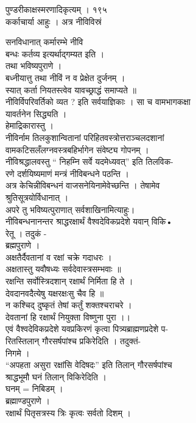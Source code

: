 \documentclass[11pt, openany]{book}
\begin{document}
{{{{ }{पुण्डरीकाक्षस्मरणादिकृत्यम् । १९५}{\\
कर्काचार्या आहुः । अत्र नीविवि}{स्रं}{सनविधानात् कर्मारम्भे नीवि\\
बन्धः कर्तव्य इत्यर्थाद्गम्यत इति ।\\
तथा भविष्यपुराणे ।\\
बध्नीयात्तु तथा नीविं न व प्रेक्षेत दुर्जनम् ।\\
स्यात् कर्ता नियतस्त्वेव यावच्छ्राद्धं समाप्यते ॥\\
नीविर्विपरिवर्तिको व्यत ? इति सर्वयाज्ञिकाः । सा च वामभागकक्षा\\
यावर्तनेन सिद्ध्यति ।\\
हेमाद्रिकारास्तु ।\\
नीविर्नाम तिलकुशान्वितानां परिहितवस्त्रोत्तराञ्चलदशानां\\
वामकटिसलँलग्नवस्त्रबहिर्भागेन संवेष्ट्य गोपनम् ।\\
नीविश्रद्धालवस्तु `` निहम्नि सर्वे यदमेध्यवत्'' इति तिलविक-\\
रणे दर्शयिष्यमाणं मन्त्रं नीविबन्धने पठन्ति ।\\
अत्र केचिन्नीविबन्धनं वाजसनेयिनामेवेच्छन्ति । तेषामेव\\
श्रुतिसूत्रयोर्विधानात् ।\\
अपरे तु भविष्यत्पुराणात् सर्वशाखिनामित्याहुः।\\
नीविबन्धनानन्तर श्राद्धरक्षार्थं वैश्वदेविकप्रदेशे यवान् विकि•\\
रेतू । तदुकं -\\
ब्रह्मपुराणे ।\\
अक्षतैर्दैवतानां व रक्षां चक्रे गदाधरः ।\\
अक्षतास्तु यवौषध्यः सर्वदेवास्त्रसम्भवाः ॥\\
रक्षन्ति सर्वोस्त्रिदशान् रक्षार्थं निर्मिता हि ते ।\\
देवदानवदैत्येषु यक्षरक्षःसु चैव हि ॥\\
न कश्चिद् दुष्कृतं तेषां कर्तुं शक्तश्चराचरे ।\\
देवतानां हि रक्षार्थं नियुक्ता विष्णुना पुरा ।।\\
एवं वैश्वदेविकप्रदेशे यवप्रकिरणं कृत्वा पित्र्यब्राह्मणप्रदेशे प-\\
रितस्तिलान् गौरसर्षपांश्च प्रकिरेदिति । तदुक्तं-\\
निगमे ।\\
``अपहता असुरा रक्षांसि वेदिषदः'' इति तिलान् गौरसर्षपांश्च\\
श्राद्धभूमौ घनं तिलान् विकिरेदिति ।\\
घनम् = निबिडम् ।\\
ब्रह्माण्डपुराणे ।\\
रक्षार्थं पितृसत्रस्य त्रिः कृत्वः सर्वतो दिशम् ।

}}}}
\end{document}
